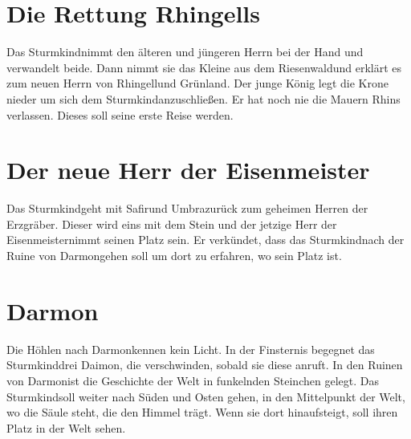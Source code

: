 \documentclass[12pt,a4paper,onecolumn,twoside,ngerman]{book}
\newcommand{\Sturmkind}{Sturmkind}
\newcommand{\Daimon}{Daimon}
\newcommand{\Umbra}{Umbra}
\newcommand{\Rhingell}{Rhingell}
\newcommand{\Rhin}{Rhin}
\newcommand{\Grunland}{Grünland}
\newcommand{\Darmon}{Darmon}
\newcommand{\Riesenwald}{Riesenwald}
\newcommand{\Eisenmeister}{Eisenmeister}
\newcommand{\Safir}{Safir}
\begin{document}
\section{Die Rettung \Rhingell{s}}
Das \Sturmkind nimmt den älteren und jüngeren Herrn bei der Hand und verwandelt beide. Dann nimmt sie das Kleine aus dem \Riesenwald und erklärt es zum neuen Herrn von \Rhingell und \Grunland. Der junge König legt die Krone nieder um sich dem \Sturmkind anzuschließen. Er hat noch nie die Mauern \Rhin{s} verlassen. Dieses soll seine erste Reise werden.

\section{Der neue Herr der \Eisenmeister}
Das \Sturmkind geht mit \Safir und \Umbra zurück zum geheimen Herren der Erzgräber. Dieser wird eins mit dem Stein und der jetzige Herr der \Eisenmeister nimmt seinen Platz sein. Er verkündet, dass das \Sturmkind nach der Ruine von \Darmon gehen soll um dort zu erfahren, wo sein Platz ist.

\section{\Darmon}
Die Höhlen nach \Darmon kennen kein Licht. In der Finsternis begegnet das \Sturmkind drei \Daimon, die verschwinden, sobald sie diese anruft.
In den Ruinen von \Darmon ist die Geschichte der Welt in funkelnden Steinchen gelegt. Das \Sturmkind soll weiter nach Süden und Osten gehen, in den Mittelpunkt der Welt, wo die Säule steht, die den Himmel trägt. Wenn sie dort hinaufsteigt, soll ihren Platz in der Welt sehen.
\end{document}
